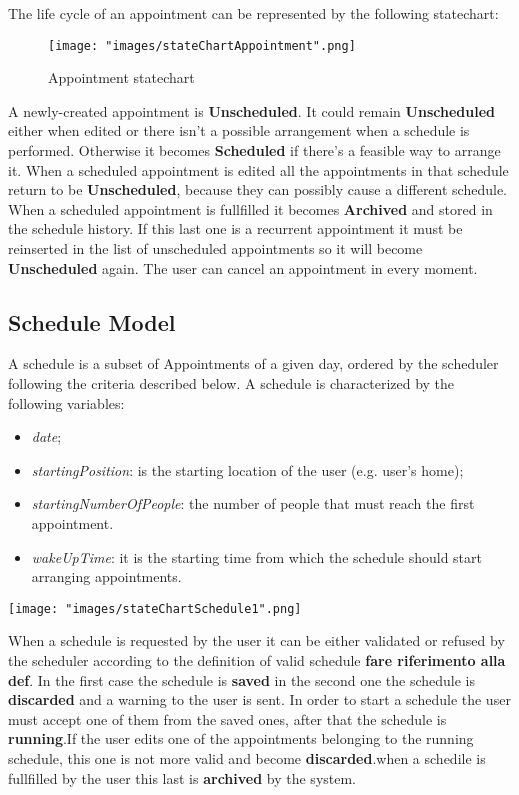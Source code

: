 The life cycle of an appointment can be represented by the following statechart:
\begin{figure}[H]
\begin{center}
\texttt{[image: "images/stateChartAppointment".png]}
\caption{Appointment statechart}
\label{fig:stchartApp}
\end{center}
\end{figure}

A newly-created appointment is \textbf{Unscheduled}. It could remain \textbf{Unscheduled} either when edited or there isn't a possible arrangement when a schedule is performed. Otherwise it becomes \textbf{Scheduled} if there's a feasible way to arrange it. When a scheduled appointment is edited all the appointments in that schedule return to be \textbf{Unscheduled}, because they can possibly cause a different schedule. When a scheduled appointment is fullfilled it becomes \textbf{Archived} and stored in the schedule history. If this last one is a recurrent appointment it must be reinserted in the list of unscheduled appointments so it will become \textbf{Unscheduled} again. The user can cancel an appointment in every moment. 

\subsection{Schedule Model} \label{subsect:schmodel}
A schedule is a subset of Appointments of a  given day, ordered by the scheduler following the criteria described below.
A schedule is characterized by the following variables:
\begin{itemize}
\item \textit{date};
\item \textit{startingPosition}: is the starting location of the user (e.g. user's home);
\item \textit{startingNumberOfPeople}: the number of people that must reach the first appointment.
\item \textit{wakeUpTime}: it is the starting time from which the schedule should start arranging appointments.
\end{itemize}

\texttt{[image: "images/stateChartSchedule1".png]}

When a schedule is requested by the user it can be either validated or refused by the scheduler according to the definition of valid schedule \textbf{fare riferimento alla def}.
In the first case the schedule is \textbf{saved} in the second one the schedule is \textbf{discarded} and a warning to the user is sent. In order to start a schedule the user must accept one of them from the saved ones, after that the schedule is \textbf{running}.If the user edits one of the appointments belonging to the running schedule, this one is not more valid and become \textbf{discarded}.when a schedile is fullfilled by the user this last is \textbf{archived} by the system.

